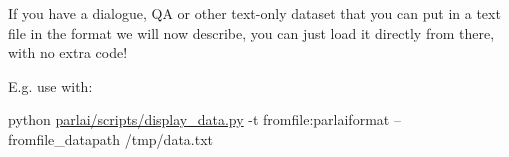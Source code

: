 If you have a dialogue, QA or other text-\/only dataset that you can put in a text file in the format we will now describe, you can just load it directly from there, with no extra code!

E.\+g. use with\+:

python \hyperlink{parlai_2scripts_2display__data_8py}{parlai/scripts/display\+\_\+data.\+py} -\/t fromfile\+:parlaiformat --fromfile\+\_\+datapath /tmp/data.txt 